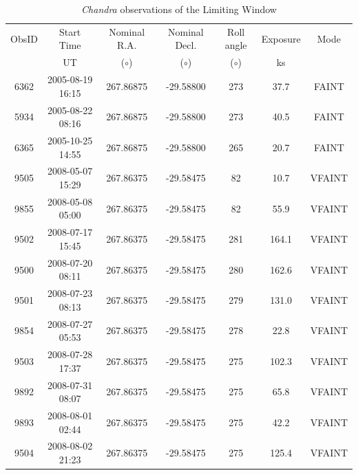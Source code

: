 \documentclass[fleqn,usenatbib]{mnras}
\begin{document}
\begin{table}
\centering
\caption{{\it Chandra} observations of the Limiting Window} \label{tab:obsinfo}
\centering
\begin{tabular}{ccccccc}
\hline
\hline
ObsID & Start Time & Nominal R.A. & Nominal Decl. &  Roll angle & Exposure & Mode\\
& UT & ($\circ$) & ($\circ$) & ($\circ$) & ks & \\ 
\hline
6362 & 2005-08-19 16:15 & 267.86875 & -29.58800 & 273 & 37.7 & FAINT \\
5934 & 2005-08-22 08:16 & 267.86875 & -29.58800 & 273 & 40.5 & FAINT \\
6365 & 2005-10-25 14:55 & 267.86875 & -29.58800 & 265 & 20.7 & FAINT \\
9505 & 2008-05-07 15:29 & 267.86375 & -29.58475 & 82  & 10.7 & VFAINT \\
9855 & 2008-05-08 05:00 & 267.86375 & -29.58475 & 82  & 55.9 & VFAINT \\
9502 & 2008-07-17 15:45 & 267.86375 & -29.58475 & 281 & 164.1 & VFAINT \\
9500 & 2008-07-20 08:11 & 267.86375 & -29.58475 & 280 & 162.6 & VFAINT \\
9501 & 2008-07-23 08:13 & 267.86375 & -29.58475 & 279 & 131.0 & VFAINT \\
9854 & 2008-07-27 05:53 & 267.86375 & -29.58475 & 278 & 22.8 & VFAINT \\
9503 & 2008-07-28 17:37 & 267.86375 & -29.58475 & 275 & 102.3 & VFAINT \\
9892 & 2008-07-31 08:07 & 267.86375 & -29.58475 & 275 & 65.8 & VFAINT \\
9893 & 2008-08-01 02:44 & 267.86375 & -29.58475 & 275 & 42.2 & VFAINT \\
9504 & 2008-08-02 21:23 & 267.86375 & -29.58475 & 275 & 125.4 & VFAINT \\
\hline
\end{tabular}
\end{table}
\end{document}
